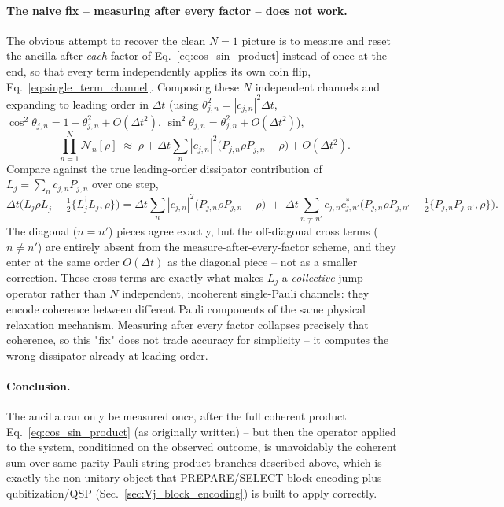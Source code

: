 \documentclass[11pt]{article}
\newcommand{\Dt}{\Delta t}
\begin{document}
\paragraph{The naive fix -- measuring after every factor -- does not work.} The obvious attempt to recover the clean $N=1$ picture is to measure and reset the ancilla after \emph{each} factor of Eq.~\eqref{eq:cos_sin_product} instead of once at the end, so that every term independently applies its own coin flip, Eq.~\eqref{eq:single_term_channel}. Composing these $N$ independent channels and expanding to leading order in $\Dt$ (using $\theta_{j,n}^2=|c_{j,n}|^2\Dt$, $\cos^2\theta_{j,n}=1-\theta_{j,n}^2+O(\Dt^2)$, $\sin^2\theta_{j,n}=\theta_{j,n}^2+O(\Dt^2)$),
\begin{equation}
    \prod_{n=1}^{N}\mathcal{N}_n[\rho] \;\approx\; \rho + \Dt\sum_n|c_{j,n}|^2\big(P_{j,n}\rho P_{j,n}-\rho\big) + O(\Dt^2).
\end{equation}
Compare against the true leading-order dissipator contribution of $L_j=\sum_nc_{j,n}P_{j,n}$ over one step,
\begin{equation}
    \Dt\Big(L_j\rho L_j^\dagger-\tfrac12\{L_j^\dagger L_j,\rho\}\Big)
    = \Dt\sum_n|c_{j,n}|^2\big(P_{j,n}\rho P_{j,n}-\rho\big)
    \;+\; \Dt\!\!\sum_{n\neq n'}\!c_{j,n}c_{j,n'}^*\Big(P_{j,n}\rho P_{j,n'}-\tfrac12\{P_{j,n}P_{j,n'},\rho\}\Big).
\end{equation}
The diagonal ($n=n'$) pieces agree exactly, but the off-diagonal cross terms ($n\neq n'$) are entirely absent from the measure-after-every-factor scheme, and they enter at the same order $O(\Dt)$ as the diagonal piece -- not as a smaller correction. These cross terms are exactly what makes $L_j$ a \emph{collective} jump operator rather than $N$ independent, incoherent single-Pauli channels: they encode coherence between different Pauli components of the same physical relaxation mechanism. Measuring after every factor collapses precisely that coherence, so this "fix" does not trade accuracy for simplicity -- it computes the wrong dissipator already at leading order.

\paragraph{Conclusion.} The ancilla can only be measured once, after the full coherent product Eq.~\eqref{eq:cos_sin_product} (as originally written) -- but then the operator applied to the system, conditioned on the observed outcome, is unavoidably the coherent sum over same-parity Pauli-string-product branches described above, which is exactly the non-unitary object that PREPARE/SELECT block encoding plus qubitization/QSP (Sec.~\ref{sec:Vj_block_encoding}) is built to apply correctly.
\end{document}
